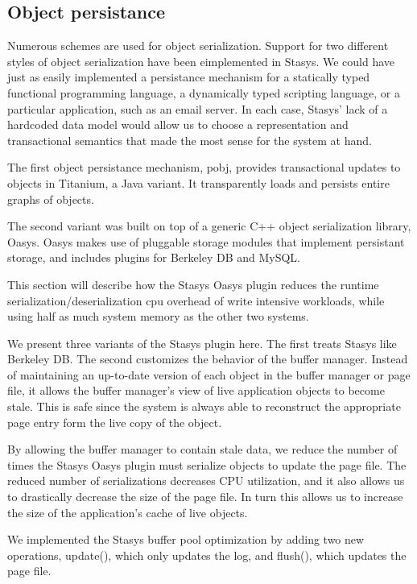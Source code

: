\documentclass[letterpaper,twocolumn,10pt]{article}
\newcommand{\yad}{Stasys\xspace}
\newcommand{\yads}{Stasys'\xspace}
\newcommand{\oasys}{Oasys\xspace}
\begin{document}
\subsection{Object persistance}
\label{sec:oasys}
Numerous schemes are used for object serialization.  Support for two
different styles of object serialization have been eimplemented in
\yad.  We could have just as easily implemented a persistance
mechanism for a statically typed functional programming language, a
dynamically typed scripting language, or a particular application,
such as an email server.  In each case, \yads lack of a hardcoded data
model would allow us to choose a representation and transactional
semantics that made the most sense for the system at hand.

The first object persistance mechanism, pobj, provides transactional updates to objects in
Titanium, a Java variant.  It transparently loads and persists
entire graphs of objects.

The second variant was built on top of a generic C++ object
serialization library, \oasys.  \oasys makes use of pluggable storage
modules that implement persistant storage, and includes plugins
for Berkeley DB and MySQL.  

This section will describe how the \yad
\oasys plugin reduces the runtime serialization/deserialization cpu
overhead of write intensive workloads, while using half as much system
memory as the other two systems.

We present three variants of the \yad plugin here.  The first treats \yad like
Berkeley DB.  The second customizes the behavior of the buffer
manager.  Instead of maintaining an up-to-date version of each object
in the buffer manager or page file, it allows the buffer manager's
view of live application objects to become stale.  This is safe since
the system is always able to reconstruct the appropriate page entry
form the live copy of the object.

By allowing the buffer manager to contain stale data, we reduce the
number of times the \yad \oasys plugin must serialize objects to
update the page file.  The reduced number of serializations decreases
CPU utilization, and it also allows us to drastically decrease the
size of the page file.  In turn this allows us to increase the size of
the application's cache of live objects.

We implemented the \yad buffer pool optimization by adding two new
operations, update(), which only updates the log, and flush(), which
updates the page file.  
\end{document}
